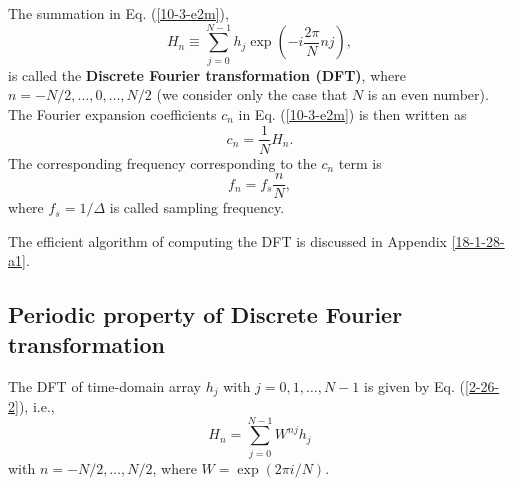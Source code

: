 \documentclass{article}
\newcommand{\tmstrong}[1]{\textbf{#1}}
\begin{document}
The summation in Eq. (\ref{10-3-e2m}),
\begin{equation}
  \label{2-26-2} H_n \equiv \sum_{j = 0}^{N - 1} h_j \exp \left( - i \frac{2
  \pi}{N} n j \right),
\end{equation}
is called the {\tmstrong{Discrete Fourier transformation (DFT)}}, where $n = -
N / 2, \ldots, 0, \ldots, N / 2$ (we consider only the case that $N$ is an
even number). The Fourier expansion coefficients $c_n$ in Eq. (\ref{10-3-e2m})
is then written as
\begin{equation}
  c_n = \frac{1}{N} H_n .
\end{equation}
The corresponding frequency corresponding to the $c_n$ term is
\begin{equation}
  \label{10-26-1} f_n = f_s \frac{n}{N},
\end{equation}
where $f_s = 1 / \Delta$ is called sampling frequency.

The efficient algorithm of computing the DFT is discussed in Appendix
\ref{18-1-28-a1}.

\subsection{Periodic property of Discrete Fourier transformation}

The DFT of time-domain array $h_j$ with $j = 0, 1, \ldots, N - 1$ is given by
Eq. (\ref{2-26-2}), i.e.,
\begin{equation}
  \label{3-25-e3} H_n = \sum_{j = 0}^{N - 1} W^{n j} h_j
\end{equation}
with $n = - N / 2, \ldots, N / 2$, where $W = \exp (2 \pi i / N)$.
\end{document}
